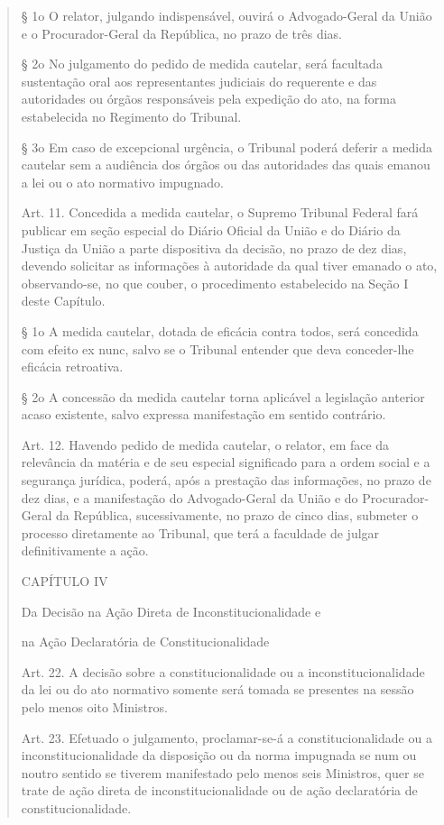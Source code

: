 \documentclass{article}
\begin{document}
\begin{quote}
§ 1o O relator, julgando indispensável, ouvirá o Advogado-Geral da União e o Procurador-Geral da República, no prazo de três dias.

§ 2o No julgamento do pedido de medida cautelar, será facultada sustentação oral aos representantes judiciais do requerente e das autoridades ou órgãos responsáveis pela expedição do ato, na forma estabelecida no Regimento do Tribunal.

§ 3o Em caso de excepcional urgência, o Tribunal poderá deferir a medida cautelar sem a audiência dos órgãos ou das autoridades das quais emanou a lei ou o ato normativo impugnado.

Art. 11. Concedida a medida cautelar, o Supremo Tribunal Federal fará publicar em seção especial do Diário Oficial da União e do Diário da Justiça da União a parte dispositiva da decisão, no prazo de dez dias, devendo solicitar as informações à autoridade da qual tiver emanado o ato, observando-se, no que couber, o procedimento estabelecido na Seção I deste Capítulo.

§ 1o A medida cautelar, dotada de eficácia contra todos, será concedida com efeito ex nunc, salvo se o Tribunal entender que deva conceder-lhe eficácia retroativa.

§ 2o A concessão da medida cautelar torna aplicável a legislação anterior acaso existente, salvo expressa manifestação em sentido contrário.

Art. 12. Havendo pedido de medida cautelar, o relator, em face da relevância da matéria e de seu especial significado para a ordem social e a segurança jurídica, poderá, após a prestação das informações, no prazo de dez dias, e a manifestação do Advogado-Geral da União e do Procurador-Geral da República, sucessivamente, no prazo de cinco dias, submeter o processo diretamente ao Tribunal, que terá a faculdade de julgar definitivamente a ação.

CAPÍTULO IV

Da Decisão na Ação Direta de Inconstitucionalidade e

na Ação Declaratória de Constitucionalidade

Art. 22. A decisão sobre a constitucionalidade ou a inconstitucionalidade da lei ou do ato normativo somente será tomada se presentes na sessão pelo menos oito Ministros.

Art. 23. Efetuado o julgamento, proclamar-se-á a constitucionalidade ou a inconstitucionalidade da disposição ou da norma impugnada se num ou noutro sentido se tiverem manifestado pelo menos seis Ministros, quer se trate de ação direta de inconstitucionalidade ou de ação declaratória de constitucionalidade.


\end{quote}
\end{document}
